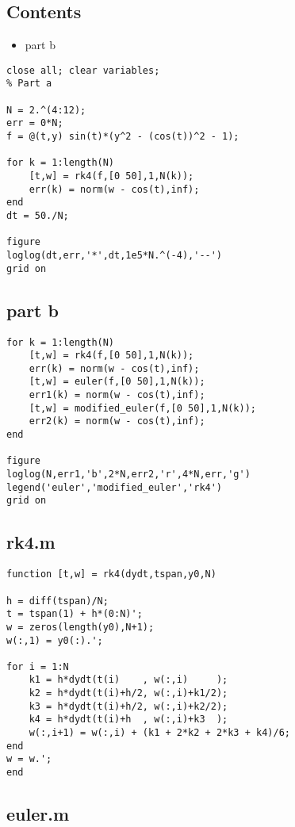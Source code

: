 \subsection*{Contents}

\begin{itemize}
\setlength{\itemsep}{-1ex}
   \item part b
\end{itemize}
\begin{verbatim}
close all; clear variables;
% Part a

N = 2.^(4:12);
err = 0*N;
f = @(t,y) sin(t)*(y^2 - (cos(t))^2 - 1);

for k = 1:length(N)
    [t,w] = rk4(f,[0 50],1,N(k));
    err(k) = norm(w - cos(t),inf);
end
dt = 50./N;

figure
loglog(dt,err,'*',dt,1e5*N.^(-4),'--')
grid on
\end{verbatim}


\subsection*{part b}

\begin{verbatim}
for k = 1:length(N)
    [t,w] = rk4(f,[0 50],1,N(k));
    err(k) = norm(w - cos(t),inf);
    [t,w] = euler(f,[0 50],1,N(k));
    err1(k) = norm(w - cos(t),inf);
    [t,w] = modified_euler(f,[0 50],1,N(k));
    err2(k) = norm(w - cos(t),inf);
end

figure
loglog(N,err1,'b',2*N,err2,'r',4*N,err,'g')
legend('euler','modified_euler','rk4')
grid on
\end{verbatim}

\subsection*{rk4.m}

    \begin{verbatim}
function [t,w] = rk4(dydt,tspan,y0,N)

h = diff(tspan)/N;
t = tspan(1) + h*(0:N)';
w = zeros(length(y0),N+1);
w(:,1) = y0(:).';

for i = 1:N
    k1 = h*dydt(t(i)    , w(:,i)     );
    k2 = h*dydt(t(i)+h/2, w(:,i)+k1/2);
    k3 = h*dydt(t(i)+h/2, w(:,i)+k2/2);
    k4 = h*dydt(t(i)+h  , w(:,i)+k3  );
    w(:,i+1) = w(:,i) + (k1 + 2*k2 + 2*k3 + k4)/6;
end
w = w.';
end
\end{verbatim}

\subsection*{euler.m}

